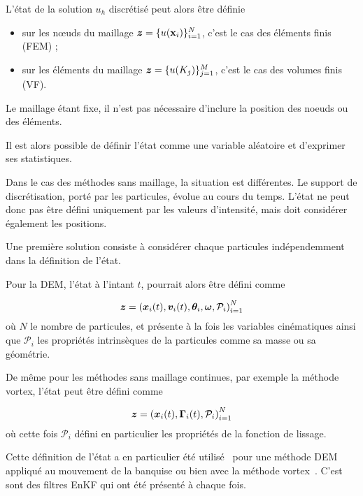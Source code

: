 L'état de la solution \(u_h\) discrétisé peut alors être définie

\begin{itemize}
    \item sur les nœuds du maillage $\bm z = \{ u(\mathbf{x}_i) \}_{i=1}^{N}$, c'est le cas des éléments finis (FEM) ;
    \item  sur les éléments du maillage $\bm z = \{ u(K_j) \}_{j=1}^{M}$, c'est le cas des volumes finis (VF).
\end{itemize}

Le maillage étant fixe, il n'est pas nécessaire d'inclure la position des noeuds ou des éléments.

Il est alors possible de définir l'état comme une variable aléatoire et d'exprimer ses statistiques.

Dans le cas des méthodes sans maillage, la situation est différentes. Le support de discrétisation, porté par les particules, évolue au cours du temps. L'état ne peut donc pas être défini uniquement par les valeurs d'intensité, mais doit considérer également les positions.

Une première solution consiste à considérer chaque particules indépendemment dans la définition de l'état.

Pour la DEM, l'état à l'intant $t$, pourrait alors être défini comme

\begin{equation*}
    \bm z = {(\bm{x}_i(t), \bm v_i(t), \bm \theta_i, \bm \omega, \mathcal P_i)}_{i=1}^N
\end{equation*}où $N$ le nombre de particules, et présente à la fois les variables cinématiques ainsi que $\mathcal P_i$ les propriétés intrinsèques de la particules comme sa masse ou sa géométrie.

De même pour les méthodes sans maillage continues, par exemple la méthode vortex, l'état peut être défini comme

\begin{equation*}
    \bm z = {(\bm{x}_i(t),\bm \Gamma_i(t), \mathcal P_i)}_{i=1}^N
\end{equation*}où cette fois $\mathcal P_i$ défini en particulier les propriétés de la fonction de lissage.

Cette définition de l'état a en particulier été utilisé~\cite{chen_superfloe_2022} pour une méthode DEM appliqué au mouvement de la banquise ou bien avec la méthode vortex~\cite{darakananda_data-assimilated_2018,le_provost_ensemble_2021}. C'est sont des filtres EnKF qui ont été présenté à chaque fois.

